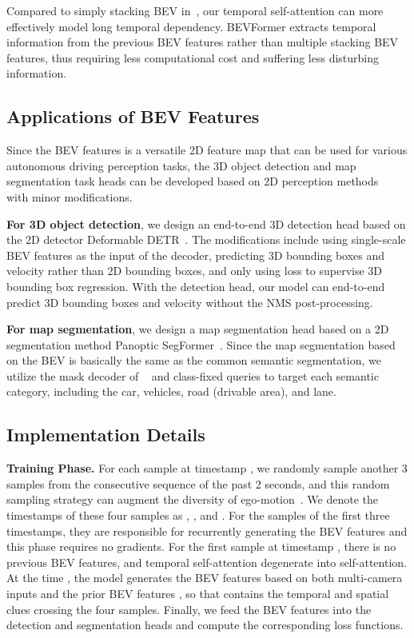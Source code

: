 \documentclass{article}
\begin{document}
Compared to simply stacking BEV in~\cite{hu2021fiery,saha2021translating,can2020understanding}, our temporal self-attention can more effectively model long temporal dependency. BEVFormer extracts temporal information from the previous BEV features rather than multiple stacking BEV features, thus requiring less computational cost and suffering less disturbing information.




    


\subsection{Applications of BEV Features}
Since the BEV features   is a versatile 2D feature map that can be used for various autonomous driving perception tasks, the 3D object detection and map segmentation task heads can be developed based on 2D perception methods~\cite{zhu2020deformable,li2021panoptic} with minor modifications. 

\noindent\textbf{For 3D object detection}, we design an end-to-end 3D detection head based on the 2D detector Deformable DETR~\cite{zhu2020deformable}. The modifications include using single-scale BEV features  as the input of the decoder, predicting 3D bounding boxes and velocity rather than 2D bounding boxes, and only using  loss
to supervise 3D bounding box regression. With the detection head, our model can end-to-end predict 3D bounding boxes and velocity without the NMS post-processing.


\noindent\textbf{For map segmentation}, we design a map segmentation head based on a 2D segmentation method Panoptic SegFormer~\cite{li2021panoptic}. Since the map segmentation based on the BEV is basically the same as the common semantic segmentation, we utilize the mask decoder of ~\cite{li2021panoptic} and class-fixed queries to target each semantic category, including the car, vehicles, road (drivable area), and lane.





\subsection{Implementation Details}
\noindent\textbf{Training Phase.} 
For each sample at timestamp , we randomly sample another 3 samples from the consecutive sequence of the past 2 seconds, and this random sampling strategy can augment  the diversity of ego-motion~\cite{zhu2017deep}. We denote the timestamps of these four samples as , ,  and .
For the samples of the first three timestamps, they are responsible for recurrently generating the BEV features  and this phase requires no gradients. For the first sample at timestamp , there is no previous BEV features, and temporal self-attention degenerate into self-attention. 
At the time , the model generates the BEV features  based on both multi-camera inputs and the prior BEV features , so that  contains the temporal and spatial clues crossing the four samples. Finally, we feed the BEV features  into the detection and segmentation heads and compute the corresponding loss functions.
\end{document}
